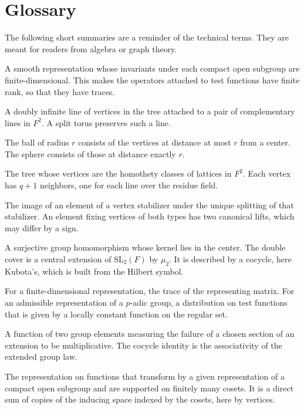 \documentclass[12pt,letterpaper]{article}
\numberwithin{equation}{section}
\theoremstyle{definition}
\theoremstyle{remark}
\begin{document}
\section*{Glossary}
The following short summaries are a reminder of the technical terms. They are meant for readers from algebra or graph theory.
\begin{description}[style=nextline,leftmargin=1.5em]
\item[Admissible representation] A smooth representation whose invariants under each compact open subgroup are finite-dimensional. This makes the operators attached to test functions have finite rank, so that they have traces.
\item[Apartment] A doubly infinite line of vertices in the tree attached to a pair of complementary lines in $F^2$. A split torus preserves such a line.
\item[Ball and sphere] The ball of radius $r$ consists of the vertices at distance at most $r$ from a center. The sphere consists of those at distance exactly $r$.
\item[Bruhat--Tits tree] The tree whose vertices are the homothety classes of lattices in $F^2$. Each vertex has $q+1$ neighbors, one for each line over the residue field.
\item[Canonical lift] The image of an element of a vertex stabilizer under the unique splitting of that stabilizer. An element fixing vertices of both types has two canonical lifts, which may differ by a sign.
\item[Central extension] A surjective group homomorphism whose kernel lies in the center. The double cover is a central extension of $\mathrm{SL}_2(F)$ by $\mu_2$. It is described by a cocycle, here Kubota's, which is built from the Hilbert symbol.
\item[Character] For a finite-dimensional representation, the trace of the representing matrix. For an admissible representation of a $p$-adic group, a distribution on test functions that is given by a locally constant function on the regular set.
\item[Cocycle] A function of two group elements measuring the failure of a chosen section of an extension to be multiplicative. The cocycle identity is the associativity of the extended group law.
\item[Compact induction] The representation on functions that transform by a given representation of a compact open subgroup and are supported on finitely many cosets. It is a direct sum of copies of the inducing space indexed by the cosets, here by vertices.

\end{description}
\end{document}

